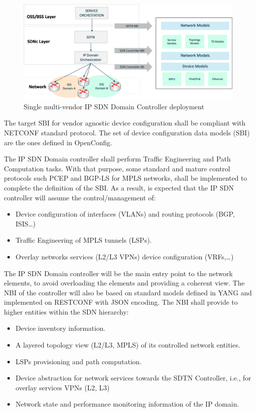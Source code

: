 \documentclass[a4paper,fleqn]{cas-dc}
\begin{document}
\begin{figure}
	\centering
		\includegraphics[scale=0.5]{figs/ifusion_multidomain_2.png}
	\caption{Single multi-vendor IP SDN Domain Controller deployment}
	\label{FIG:2}
\end{figure}

The target SBI for vendor agnostic device configuration shall be compliant with NETCONF standard protocol. The  set of device configuration data models (SBI) are the ones defined in OpenConfig.

The IP SDN Domain controller shall perform Traffic Engineering and Path Computation tasks. With that purpose, some standard and mature control protocols such PCEP and BGP-LS for MPLS networks, shall be implemented to complete the definition of the SBI. As a result,  is expected that the IP SDN controller will assume the control/management of:
\begin{itemize}
\item Device configuration of interfaces (VLANs) and routing protocols (BGP, ISIS…)
\item Traffic Engineering of MPLS tunnels (LSPs). 
\item Overlay networks services (L2/L3 VPNs) device configuration (VRFs,\dots)
\end{itemize}

The IP SDN Domain controller will be the main entry point to the network elements, to avoid overloading the elements and providing a coherent view. The NBI of the controller will also be based on standard models defined in YANG and implemented on RESTCONF with JSON encoding. The NBI shall provide to higher entities within the SDN hierarchy:
\begin{itemize}
\item Device inventory information.
\item A layered topology view (L2/L3, MPLS) of its controlled network entities.
\item LSPs provisioning and path computation.
\item Device abstraction for network services towards the SDTN Controller, i.e., for overlay services VPNs (L2, L3)
\item Network state and performance monitoring information of the IP domain. 
\end{itemize}
\end{document}
